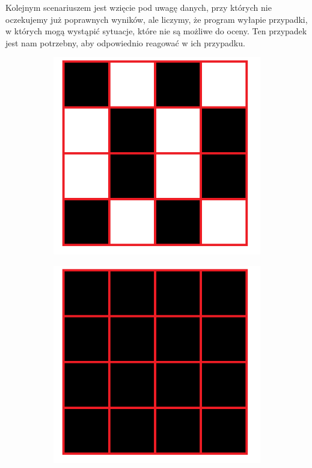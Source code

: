\documentclass[a4paper, titleauthor]{mwart}
\begin{document}
Kolejnym scenariuszem jest wzięcie pod uwagę danych, przy których nie oczekujemy już poprawnych wyników, ale liczymy, że program wyłapie przypadki, w których mogą wystąpić sytuacje, które nie są możliwe do oceny. Ten przypadek jest nam potrzebny, aby odpowiednio reagować w ich przypadku.

\begin{figure}[htbp]
\centering
\begin{subfigure}{0.3\textwidth}
  \centering
  \includegraphics[width=\linewidth]{OX.png}
  \label{fig:sub1}
\end{subfigure}
\begin{subfigure}{0,3\textwidth}
  \centering
  \includegraphics[width=\linewidth]{OX2.png}

\end{subfigure}
\end{figure}
\end{document}
